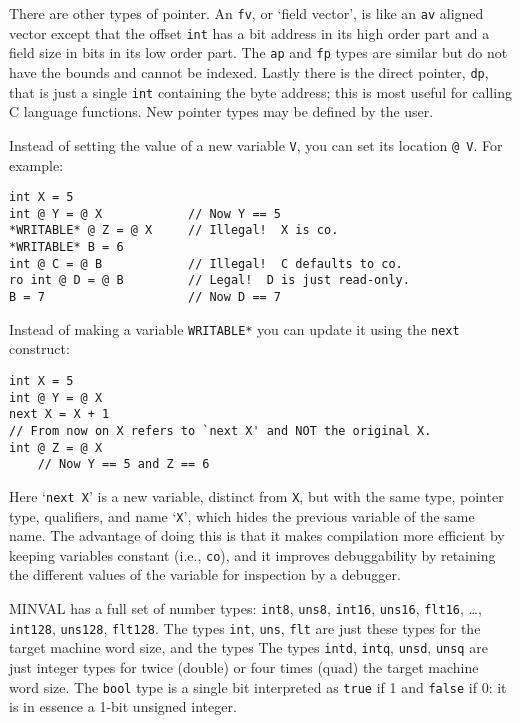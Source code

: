 \documentclass[12pt]{article}
\newenvironment{indpar}[1][0.3in]%
	{\begin{list}{}%
		     {\setlength{\itemsep}{0in}%
		      \setlength{\topsep}{0in}%
		      \setlength{\parsep}{1ex}%
		      \setlength{\labelwidth}{#1}%
		      \setlength{\leftmargin}{#1}%
		      \addtolength{\leftmargin}{\labelsep}}%
	 \item}%
	{\end{list}}
\begin{document}
There are other types of pointer.  An {\tt fv}, or `field vector',
is like an {\tt av} aligned
vector except that the offset {\tt int} has a bit address in its
high order part and a field size in bits in its low order part.
The {\tt ap} and {\tt fp} types are
similar but do not have the bounds and cannot be indexed.  Lastly
there is the direct pointer, {\tt dp}, that is just a single {\tt int}
containing the byte address; this is most useful for calling
C language functions.
New pointer types may be defined by the user.

Instead of setting the value of a new variable {\tt V}, you can 
set its location {\tt @ V}.  For example:
\begin{indpar}\begin{verbatim}
int X = 5
int @ Y = @ X            // Now Y == 5
*WRITABLE* @ Z = @ X     // Illegal!  X is co.
*WRITABLE* B = 6
int @ C = @ B            // Illegal!  C defaults to co.
ro int @ D = @ B         // Legal!  D is just read-only.
B = 7                    // Now D == 7
\end{verbatim}\end{indpar}

Instead of making a variable {\tt *WRITABLE*} you can update
it using the {\tt next} construct:
\begin{indpar}\begin{verbatim}
int X = 5
int @ Y = @ X
next X = X + 1
// From now on X refers to `next X' and NOT the original X.
int @ Z = @ X
    // Now Y == 5 and Z == 6
\end{verbatim}\end{indpar}
Here `{\tt next X}' is a new variable, distinct from {\tt X},
but with the same type, pointer type, qualifiers, and name `{\tt X}',
which hides the previous variable of the same name.
The advantage of doing this is that it makes compilation more
efficient by keeping variables constant (i.e., {\tt co}), and
it improves debuggability by retaining the different values of
the variable for inspection by a debugger.

MINVAL has a full set of number types:
{\tt int8}, {\tt uns8},
{\tt int16}, {\tt uns16}, {\tt flt16}, \ldots,
{\tt int128}, {\tt uns128}, {\tt flt128}.
The types {\tt int}, {\tt uns}, {\tt flt} are just these
types for the target machine word size, and the types
The types {\tt intd}, {\tt intq}, {\tt unsd}, {\tt unsq} are just integer
types for twice (double) or four times (quad) the target machine word size.
The {\tt bool} type is a single bit interpreted as {\tt true} if
1 and {\tt false} if 0: it is in essence a 1-bit unsigned integer.
\end{document}
